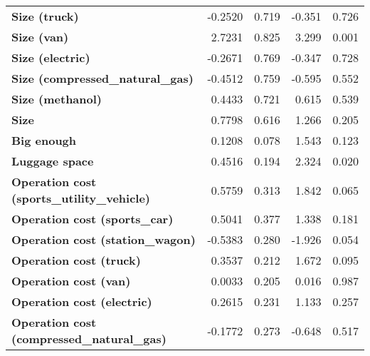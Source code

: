\begin{tabular}{lrrrr}
\textbf{Size (truck)}                                            &      -0.2520  &        0.719     &    -0.351  &         0.726        \\
\textbf{Size (van)}                                              &       2.7231  &        0.825     &     3.299  &         0.001        \\
\textbf{Size (electric)}                                         &      -0.2671  &        0.769     &    -0.347  &         0.728        \\
\textbf{Size (compressed\_natural\_gas)}                         &      -0.4512  &        0.759     &    -0.595  &         0.552        \\
\textbf{Size (methanol)}                                         &       0.4433  &        0.721     &     0.615  &         0.539        \\
\textbf{Size}                                                    &       0.7798  &        0.616     &     1.266  &         0.205        \\
\textbf{Big enough}                                              &       0.1208  &        0.078     &     1.543  &         0.123        \\
\textbf{Luggage space}                                           &       0.4516  &        0.194     &     2.324  &         0.020        \\
\textbf{Operation cost (sports\_utility\_vehicle)}               &       0.5759  &        0.313     &     1.842  &         0.065        \\
\textbf{Operation cost (sports\_car)}                            &       0.5041  &        0.377     &     1.338  &         0.181        \\
\textbf{Operation cost (station\_wagon)}                         &      -0.5383  &        0.280     &    -1.926  &         0.054        \\
\textbf{Operation cost (truck)}                                  &       0.3537  &        0.212     &     1.672  &         0.095        \\
\textbf{Operation cost (van)}                                    &       0.0033  &        0.205     &     0.016  &         0.987        \\
\textbf{Operation cost (electric)}                               &       0.2615  &        0.231     &     1.133  &         0.257        \\
\textbf{Operation cost (compressed\_natural\_gas)}               &      -0.1772  &        0.273     &    -0.648  &         0.517        \\

\end{tabular}
